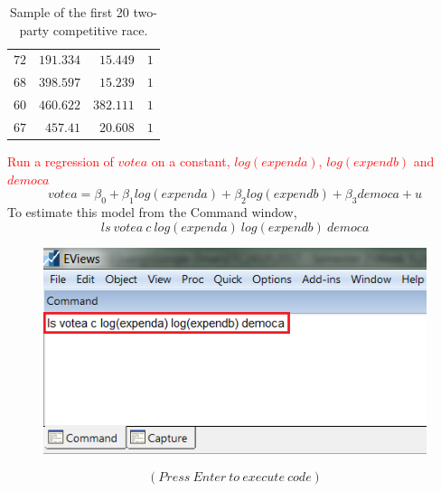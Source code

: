 \documentclass[12pt]{report}
\begin{document}
\begin{table}[H]
\begin{tabular}{lrrr}
		\multicolumn{1}{r}{$72$}&\multicolumn{1}{r}{$191.334$}&\multicolumn{1}{r}{$15.449$}&\multicolumn{1}{r}{$1$}\\
		\multicolumn{1}{r}{$68$}&\multicolumn{1}{r}{$398.597$}&\multicolumn{1}{r}{$15.239$}&\multicolumn{1}{r}{$1$}\\
		\multicolumn{1}{r}{$60$}&\multicolumn{1}{r}{$460.622$}&\multicolumn{1}{r}{$382.111$}&\multicolumn{1}{r}{$1$}\\
		\multicolumn{1}{r}{$67$}&\multicolumn{1}{r}{$457.41$}&\multicolumn{1}{r}{$20.608$}&\multicolumn{1}{r}{$1$}\\
	\end{tabular}
	\caption{Sample of the first 20 two-party competitive race.}
\end{table}


\newpage
\noindent \textcolor{red}
{
	Run a regression of $votea$ on a constant, $log(expenda)$, $log(expendb)$ and $democa$
}
$$votea = \beta_0 + \beta_1log(expenda) + \beta_2log(expendb) + \beta_3democa + u $$
\noindent To estimate this model from the Command window,
$$ls\ votea\ c\ log(expenda)\ log(expendb)\ democa$$
\begin{figure}[H]
	\centering
	\includegraphics{q1_1}
\end{figure}
\vspace{-\baselineskip}
$$(Press\ Enter\ to\ execute\ code)$$
\end{document}
